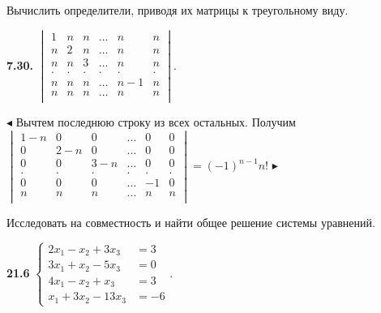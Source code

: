 \documentclass[a5paper,10pt]{article}
\begin{document}

\bigskip
\noindent
Вычислить определители, приводя их матрицы к треугольному виду.

\medskip
\noindent
{\bf 7.30.}
$\begin{vmatrix}
1&n&n&\ldots&n&n\\
n&2&n&\ldots&n&n\\
n&n&3&\ldots&n&n\\
.&.&.&.&.&.\\
n&n&n&\ldots&n-1&n\\
n&n&n&\ldots&n&n\\
\end{vmatrix}$.

\medskip
\noindent
$\blacktriangleleft$ Вычтем последнюю строку из всех остальных. Получим\\[3pt]
$\begin{vmatrix}
1-n&0&0&\ldots&0&0\\
0&2-n&0&\ldots&0&0\\
0&0&3-n&\ldots&0&0\\
.&.&.&.&.&.\\
0&0&0&\ldots&-1&0\\
n&n&n&\ldots&n&n\\
\end{vmatrix}=(-1)^{n-1}n!$
$\blacktriangleright$

\bigskip
\noindent
Исследовать на совместность и найти общее решение системы уравнений.

\medskip
\noindent
{\bf 21.6}
$\begin{cases}
2x_1-x_2+3x_3&=3\\
3x_1+x_2-5x_3&=0\\
4x_1-x_2+x_3&=3\\
x_1+3x_2-13x_3&=-6
\end{cases}$.
\end{document}
